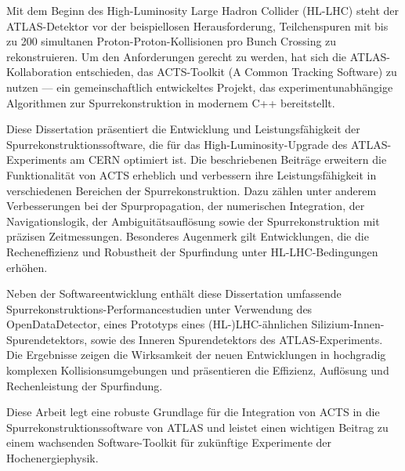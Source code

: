 Mit dem Beginn des High-Luminosity Large Hadron Collider (HL-LHC) steht der ATLAS-Detektor vor der beispiellosen Herausforderung, Teilchenspuren mit bis zu 200 simultanen Proton-Proton-Kollisionen pro Bunch Crossing zu rekonstruieren. Um den Anforderungen gerecht zu werden, hat sich die ATLAS-Kollaboration entschieden, das ACTS-Toolkit (A Common Tracking Software) zu nutzen — ein gemeinschaftlich entwickeltes Projekt, das experimentunabhängige Algorithmen zur Spurrekonstruktion in modernem C++ bereitstellt.

Diese Dissertation präsentiert die Entwicklung und Leistungsfähigkeit der Spurrekonstruktionssoftware, die für das High-Luminosity-Upgrade des ATLAS-Experiments am CERN optimiert ist. Die beschriebenen Beiträge erweitern die Funktionalität von ACTS erheblich und verbessern ihre Leistungsfähigkeit in verschiedenen Bereichen der Spurrekonstruktion. Dazu zählen unter anderem Verbesserungen bei der Spurpropagation, der numerischen Integration, der Navigationslogik, der Ambiguitätsauflösung sowie der Spurrekonstruktion mit präzisen Zeitmessungen. Besonderes Augenmerk gilt Entwicklungen, die die Recheneffizienz und Robustheit der Spurfindung unter HL-LHC-Bedingungen erhöhen.

Neben der Softwareentwicklung enthält diese Dissertation umfassende Spurrekonstruktions-Performancestudien unter Verwendung des OpenDataDetector, eines Prototyps eines (HL-)LHC-ähnlichen Silizium-Innen-Spurendetektors, sowie des Inneren Spurendetektors des ATLAS-Experiments. Die Ergebnisse zeigen die Wirksamkeit der neuen Entwicklungen in hochgradig komplexen Kollisionsumgebungen und präsentieren die Effizienz, Auflösung und Rechenleistung der Spurfindung.

Diese Arbeit legt eine robuste Grundlage für die Integration von ACTS in die Spurrekonstruktionssoftware von ATLAS und leistet einen wichtigen Beitrag zu einem wachsenden Software-Toolkit für zukünftige Experimente der Hochenergiephysik.
